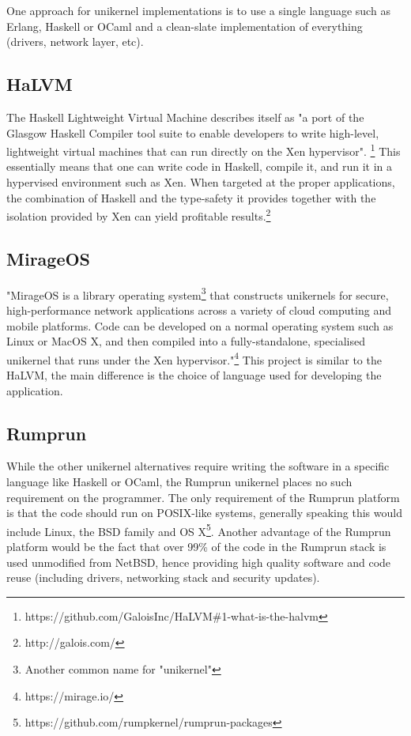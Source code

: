 \documentclass[10pt,a4paper,twoside]{article}
\begin{document}
One approach for unikernel implementations is to use a single language such as Erlang, Haskell or OCaml and a clean-slate implementation of everything (drivers, network layer, etc).\cite{RumpComparison}

\subsection{HaLVM}

The Haskell Lightweight Virtual Machine describes itself as
"a port of the Glasgow Haskell Compiler tool suite to enable developers to write high-level,
lightweight virtual machines that can run directly on the Xen hypervisor".
\footnote{https://github.com/GaloisInc/HaLVM\#1-what-is-the-halvm}
This essentially means that one can write code in Haskell, compile it, and run it in a hypervised environment
such as Xen. When targeted at the proper applications, the combination of Haskell and the type-safety it provides
together with the isolation provided by Xen can yield profitable results.\footnote{http://galois.com/}

\subsection{MirageOS}
"MirageOS is a library operating system\footnote{Another common name for "unikernel"} that constructs unikernels for secure, high-performance network applications across a variety of cloud computing and mobile platforms. Code can be developed on a normal operating system such as Linux or MacOS X, and then compiled into a fully-standalone, specialised unikernel that runs under the Xen hypervisor."\footnote{https://mirage.io/} This project is similar to the HaLVM, the main difference is the choice of language used for developing the application.

\subsection{Rumprun}
While the other unikernel alternatives require writing the software in a specific language like Haskell or OCaml, the Rumprun unikernel places no such requirement on the programmer. The only requirement of the Rumprun platform is that the code should run on POSIX-like systems, generally speaking this would include Linux, the BSD family and OS X\footnote{https://github.com/rumpkernel/rumprun-packages}. Another advantage of the Rumprun platform would be the fact that over 99\% of the code in the Rumprun stack is used unmodified from NetBSD, hence providing high quality software and code reuse (including drivers, networking stack and security updates).\cite{RumpComparison}
\end{document}
